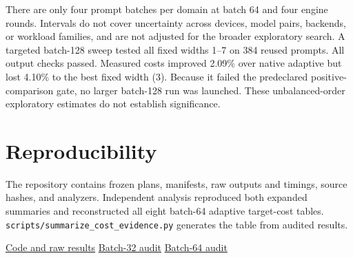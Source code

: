 \documentclass[10pt]{article}
\begin{document}
There are only four prompt batches per domain at batch 64 and four engine rounds. Intervals do not cover uncertainty across devices, model pairs, backends, or workload families, and are not adjusted for the broader exploratory search. A targeted batch-128 sweep tested all fixed widths 1--7 on 384 reused prompts. All output checks passed. Measured costs improved 2.09\% over native adaptive but lost 4.10\% to the best fixed width (3). Because it failed the predeclared positive-comparison gate, no larger batch-128 run was launched. These unbalanced-order exploratory estimates do not establish significance.
\section{Reproducibility}
The repository contains frozen plans, manifests, raw outputs and timings, source hashes, and analyzers. Independent analysis reproduced both expanded summaries and reconstructed all eight batch-64 adaptive target-cost tables. \texttt{scripts/summarize\_cost\_evidence.py} generates the table from audited results.

\noindent\href{https://github.com/angelinaquan/adaptive-verification-for-speculative-decoding}{Code and raw results}\quad
\href{https://wandb.ai/aquan-world-model/18657-speculative-pilot/runs/vxw4i4v4}{Batch-32 audit}\quad
\href{https://wandb.ai/aquan-world-model/18657-speculative-pilot/runs/az4k5l1i}{Batch-64 audit}
\end{document}
